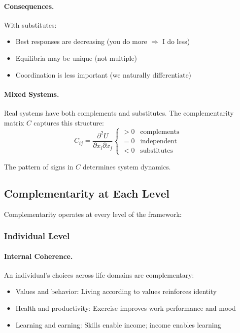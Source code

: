 \documentclass[12pt,a4paper]{article}
\begin{document}
\paragraph{Consequences.}
With substitutes:
\begin{itemize}
  \item Best responses are decreasing (you do more $\Rightarrow$ I do less)
  \item Equilibria may be unique (not multiple)
  \item Coordination is less important (we naturally differentiate)
\end{itemize}

\paragraph{Mixed Systems.}
Real systems have both complements and substitutes.
The complementarity matrix $C$ captures this structure:
\begin{equation}
  C_{ij} = \frac{\partial^2 U}{\partial x_i \partial x_j}
  \begin{cases}
    > 0 & \text{complements} \\
    = 0 & \text{independent} \\
    < 0 & \text{substitutes}
  \end{cases}
\end{equation}

The pattern of signs in $C$ determines system dynamics.

\subsection{Complementarity at Each Level}

Complementarity operates at every level of the framework:

\subsubsection{Individual Level}

\paragraph{Internal Coherence.}
An individual's choices across life domains are complementary:
\begin{itemize}
  \item Values and behavior: Living according to values reinforces identity
  \item Health and productivity: Exercise improves work performance and mood
  \item Learning and earning: Skills enable income; income enables learning
\end{itemize}
\end{document}
